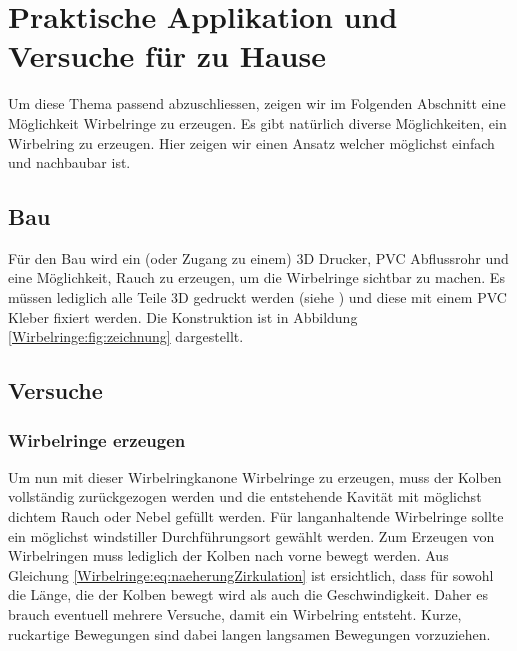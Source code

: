 %
%
%
\section{Praktische Applikation und Versuche für zu Hause}

Um diese Thema passend abzuschliessen, zeigen wir im Folgenden Abschnitt eine Möglichkeit Wirbelringe zu erzeugen.
Es gibt natürlich diverse Möglichkeiten, ein Wirbelring zu erzeugen. 
Hier zeigen wir einen Ansatz welcher möglichst einfach und nachbaubar ist.

\subsection{Bau}


Für den Bau wird ein (oder Zugang zu einem) 3D Drucker,  PVC Abflussrohr und eine Möglichkeit, Rauch zu erzeugen, um die Wirbelringe sichtbar zu machen. 
Es müssen lediglich alle Teile 3D gedruckt werden (siehe \cite{Wirbelringe:3D_modelle}) und diese mit einem PVC Kleber fixiert werden. 
Die Konstruktion ist in Abbildung \ref{Wirbelringe:fig:zeichnung} dargestellt.

\subsection{Versuche}

\subsubsection{Wirbelringe erzeugen \label{Wirbelringe:wirbelringeerzeugen}}

Um nun mit dieser Wirbelringkanone Wirbelringe zu erzeugen, muss der Kolben vollständig zurückgezogen werden und die entstehende Kavität mit möglichst dichtem Rauch oder Nebel gefüllt werden.
Für langanhaltende Wirbelringe sollte ein möglichst windstiller Durchführungsort gewählt werden.
Zum Erzeugen von Wirbelringen muss lediglich der Kolben nach vorne bewegt werden.
Aus Gleichung \eqref{Wirbelringe:eq:naeherungZirkulation} ist ersichtlich, dass für sowohl die Länge, die der Kolben bewegt wird als auch die Geschwindigkeit.
Daher es brauch eventuell mehrere Versuche, damit ein Wirbelring entsteht.
Kurze, ruckartige Bewegungen sind dabei langen langsamen Bewegungen vorzuziehen.

